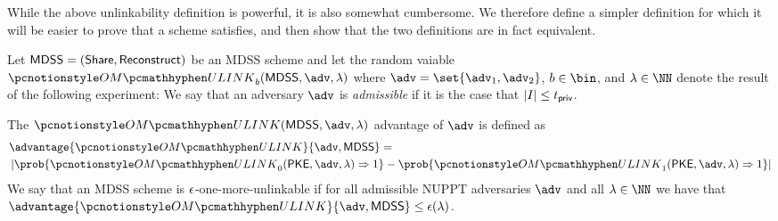 While the above unlinkability definition is powerful, it is also somewhat cumbersome.
We therefore define a simpler definition for which it will be easier to prove that a scheme satisfies, and then show that the two definitions are in fact equivalent.

\begin{definition}
	Let $\mathsf{MDSS} = (\mathsf{Share}, \mathsf{Reconstruct})$ be an MDSS scheme and let the random vaiable $\omulink_b(\mdss, \adv, \secpar)$ where $\adv = \set{\adv_1, \adv_2}$, $b \in \bin$, and $\secpar \in \NN$ denote the result of the following experiment:
	We say that an adversary $\adv$ is \emph{admissible} if it is the case that $|I| \leq t_{\mathsf{priv}}$.

	The $\omulink(\mdss, \adv, \secpar)$ advantage of $\adv$ is defined as
	\begin{align*}
		 & \advantage{\omulink}{\adv, \mdss} =                                                                                      \\
		 & \left|\prob{\omulink_0(\pke, \adv, \secpar) \Rightarrow 1} - \prob{\omulink_1(\pke, \adv, \secpar) \Rightarrow 1}\right|
	\end{align*}
	We say that an MDSS scheme is $\epsilon$-one-more-unlinkable if for all admissible NUPPT adversaries $\adv$ and all $\secpar \in \NN$ we have that $\advantage{\omulink}{\adv, \mdss} \leq \mdssULVar(\secpar)$.

\end{definition}

